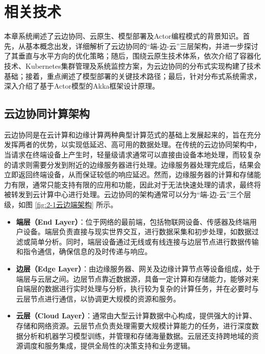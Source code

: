 
\chapter{相关技术}

本章系统阐述了云边协同、云原生、模型部署及Actor编程模式的背景知识。首先，从基本概念出发，详细解析了云边协同的“端-边-云”三层架构，并进一步探讨了其垂直与水平方向的优化策略；随后，围绕云原生技术体系，依次介绍了容器化技术、Kubernetes集群管理及系统监控方案，为云边协同的分布式实现构建了技术基础；接着，重点阐述了模型部署的关键技术路径；最后，针对分布式系统需求，深入介绍了基于Actor模型的Akka框架设计原理。

\section{云边协同计算架构}

云边协同是在云计算和边缘计算两种典型计算范式的基础上发展起来的，旨在充分发挥两者的优势，以实现低延迟、高可用的数据处理\cite{李波2021基于软件定义网络的云边协同架构研究综述}。在传统的云边协同架构中，当请求在终端设备上产生时，轻量级请求通常可以直接由设备本地处理，而较复杂的请求则需要分发到附近的边缘服务器进行处理。边缘服务器处理完成后，结果会立即返回终端设备，从而保证较低的响应延迟。然而，边缘服务器的计算和存储能力有限，通常只能支持有限的应用和功能，因此对于无法快速处理的请求，最终将被转发到云计算中心进行处理。云边协同的架构通常可以分为“端-边-云”三个层级\cite{mao2017survey,satyanarayanan2017emergence,吴大鹏2018端}，如图 \ref{fig:2-1云边端架构} 所示。

\begin{itemize} 
    \item \textbf{端层（End Layer）}：位于网络的最前端，包括物联网设备、传感器及终端用户设备。端层负责直接与现实世界交互，进行数据采集和初步处理，如数据过滤或简单分析。同时，端层设备通过无线或有线连接与边层节点进行数据传输和指令通信，确保信息的及时传递与响应。
    \item \textbf{边层（Edge Layer）}：由边缘服务器、网关及边缘计算节点等设备组成，处于端层与云层之间。边层节点靠近数据源，具备一定计算和存储能力，能够对来自端层的数据进行实时处理与分析，执行较为复杂的计算任务，并在必要时与云层节点进行通信，以协调更大规模的资源和服务。
    \item \textbf{云层（Cloud Layer）}：通常由大型云计算数据中心构成，提供强大的计算、存储和网络资源。云层节点负责处理需要大规模计算能力的任务，进行深度数据分析和机器学习模型训练，并管理和存储海量数据。云层还支持跨地域的资源调度和服务集成，提供全局性的决策支持和业务逻辑。
\end{itemize}

